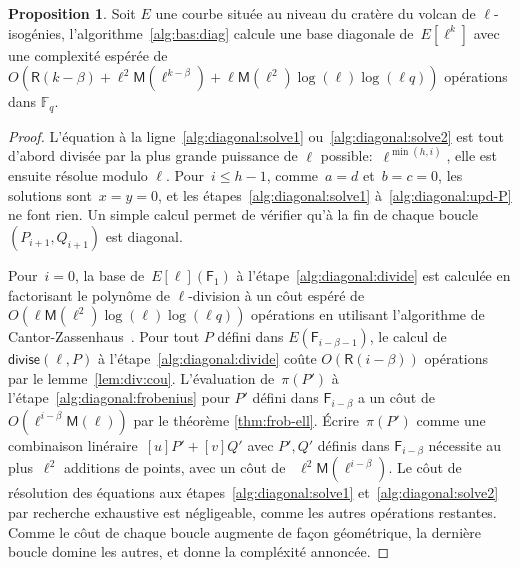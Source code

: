 \documentclass[10pt,a4paper]{book}
\theoremstyle{plain}
\theoremstyle{definition}
\theoremstyle{definition}
\theoremstyle{definition}
\newtheorem{prop}[thm]{Proposition}
\theoremstyle{definition}
\theoremstyle{remark}
\theoremstyle{remark}
\theoremstyle{definition}
\begin{document}
\begin{prop}\label{pro:alg:diagonal}
  Soit $E$ une courbe située au niveau du cratère du volcan de 
  $\ell$-isogénies, l'algorithme~\ref{alg:bas:diag} calcule une  base diagonale
  de~$E[\ell^k]$ avec une complexité espérée de
  $O(\mathsf{R}(k-\beta) + \ell^2\mathsf{M}(\ell^{k-\beta}) + \ell\mathsf{M}(\ell^2)\log(\ell)\log(\ell q))$ opérations dans $\mathbb{F}_q$.
\end{prop}

\begin{proof}
L'équation à la ligne~\ref{alg:diagonal:solve1} ou~\ref{alg:diagonal:solve2}
est tout d'abord divisée par la plus grande puissance de $\ell$ possible:~$\ell^{\min (h, i)}$,
 elle est ensuite résolue modulo $\ell$.
Pour~$i \leqslant h-1$, comme~$a = d$ et~$b = c = 0$,
les solutions sont~$x = y = 0$, et les
étapes~\ref{alg:diagonal:solve1} à~\ref{alg:diagonal:upd-P} ne font rien.
Un simple calcul permet de vérifier qu'à la fin de chaque boucle
$(P_{i+1},Q_{i+1})$ est diagonal.

Pour~$i = 0$, la base de~$E[\ell](\mathsf{F}_1)$ à l'étape~\ref{alg:diagonal:divide}
est calculée en factorisant le polynôme de $\ell$-division
à un côut espéré de $O(\ell\mathsf{M}(\ell^2)\log(\ell)\log(\ell q))$
opérations en utilisant l'algorithme de Cantor-Zassenhaus~\cite[Chapter 14.5]{vzGJG03}.
  Pour tout $P$ défini dans $E(\mathsf{F}_{i-\beta-1})$, le calcul de
  $\mathsf{divise}(\ell, P)$ à l'étape~\ref{alg:diagonal:divide} coûte $O(\mathsf{R}(i-\beta))$
  opérations par le lemme~\ref{lem:div:cou}.
  L'évaluation de~$\pi(P')$ à l'étape~\ref{alg:diagonal:frobenius} pour $P'$ 
  défini dans $\mathsf{F}_{i-\beta}$ a un côut
  de~$O(\ell^{i-\beta}\mathsf{M}(\ell))$ par le théorème \ref{thm:frob-ell}.
  \'Ecrire~$\pi(P')$ comme une combinaison linéraire~$[u] P' + [v] Q'$ avec 
  $P',Q'$ définis dans $\mathsf{F}_{i-\beta}$ nécessite au
  plus~$\ell^2$ additions de points, avec un côut de ~$\ell^2
  \mathsf{M}(\ell^{i-\beta})$.
  Le côut de résolution des équations aux étapes~\ref{alg:diagonal:solve1}
  et~\ref{alg:diagonal:solve2} par recherche exhaustive est négligeable, comme
  les autres opérations restantes. Comme le côut de chaque boucle augmente
  de façon géométrique, la dernière boucle domine les autres, et donne la
  compléxité annoncée.
\end{proof}
\end{document}

